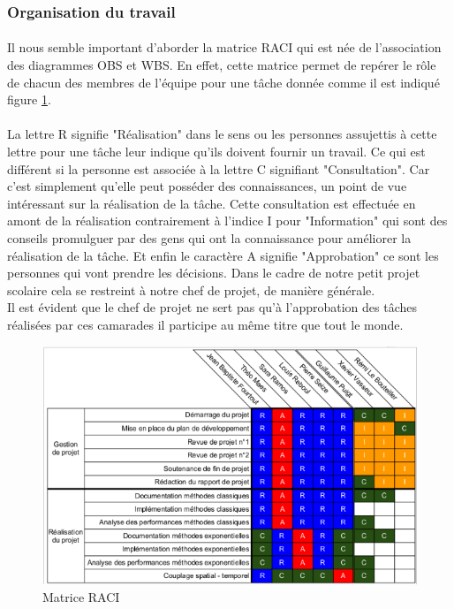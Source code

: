     \subsubsection{Organisation du travail}
    \paragraph{}
    Il nous semble important d'aborder la matrice RACI qui est née de l'association des diagrammes OBS et WBS. En effet, cette matrice permet de repérer le rôle de chacun des membres de l'équipe pour une tâche donnée comme il est indiqué figure \ref{fig:RACI}.
    \paragraph{}
    La lettre R signifie "Réalisation" dans le sens ou les personnes assujettis à cette lettre pour une tâche leur indique qu'ils doivent fournir un travail. Ce qui est différent si la personne est associée à la lettre C signifiant "Consultation". Car c'est simplement qu'elle peut posséder des connaissances, un point de vue intéressant sur la réalisation de la tâche. Cette consultation est effectuée en amont de la réalisation contrairement à l'indice I pour "Information" qui sont des conseils promulguer par des gens qui ont la connaissance pour améliorer la réalisation de la tâche. Et enfin le caractère A signifie "Approbation" ce sont les personnes qui vont prendre les décisions. Dans le cadre de notre petit projet scolaire cela se restreint à notre chef de projet, de manière générale.\\
    Il est évident que le chef de projet ne sert pas qu'à l'approbation des tâches réalisées par ces camarades il participe au même titre que tout le monde.
    \begin{figure}[h]
        \centering
        \includegraphics[width=\textwidth]{images/OB2.png}
  	    \caption{Matrice RACI} 
    \label{fig:RACI}
    \end{figure}
